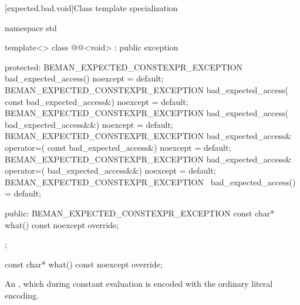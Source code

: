 [expected.bad.void]{Class template specialization }

\begin{codeblock}
namespace std {
  template<>
  class @@<void> : public exception {
  protected:
    BEMAN_EXPECTED_CONSTEXPR_EXCEPTION bad_expected_access() noexcept = default;
    BEMAN_EXPECTED_CONSTEXPR_EXCEPTION bad_expected_access(
        const bad_expected_access&) noexcept = default;
    BEMAN_EXPECTED_CONSTEXPR_EXCEPTION bad_expected_access(
        bad_expected_access&&) noexcept = default;
    BEMAN_EXPECTED_CONSTEXPR_EXCEPTION bad_expected_access& operator=(
        const bad_expected_access&) noexcept = default;
    BEMAN_EXPECTED_CONSTEXPR_EXCEPTION bad_expected_access& operator=(
        bad_expected_access&&) noexcept = default;
    BEMAN_EXPECTED_CONSTEXPR_EXCEPTION ~bad_expected_access() = default;

  public:
    BEMAN_EXPECTED_CONSTEXPR_EXCEPTION const char* what() const noexcept override;
  };
}
\end{codeblock}

%
\begin{itemdecl}
const char* what() const noexcept override;
\end{itemdecl}

\begin{itemdescr}
\pnum
\returns
An  \ntbs{}, which during constant evaluation is encoded with the ordinary literal encoding.
\end{itemdescr}
